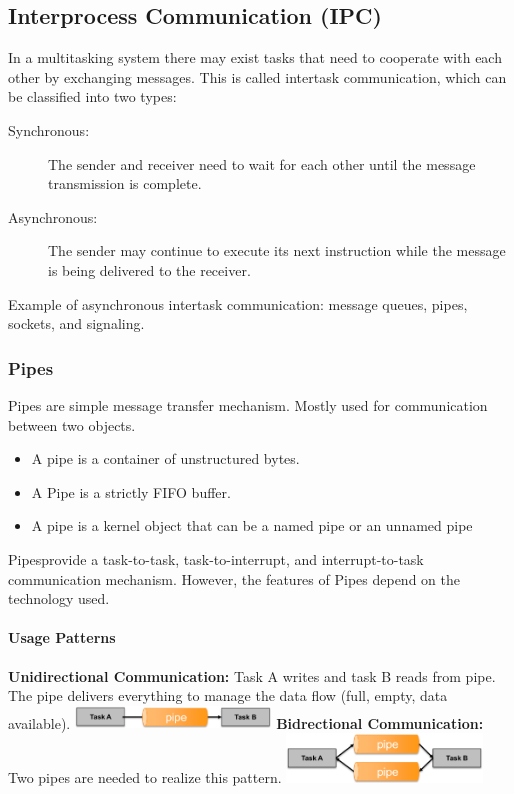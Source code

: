 \subsection{Interprocess Communication (IPC)}
In a multitasking system there may exist tasks that need to cooperate with each other by exchanging messages.
This is called intertask communication, which can be classified into two types:
\begin{description}
  \item[Synchronous:] The sender and receiver need to wait for each other until the message transmission is complete.
  \item[Asynchronous:] The sender may continue to execute its next instruction while the message is being delivered to the receiver.
\end{description}
Example of asynchronous intertask communication: message queues, pipes, sockets, and signaling.

\subsubsection{Pipes}
Pipes are simple message transfer mechanism.
Mostly used for communication between two objects.
\begin{itemize}
  \item A pipe is a container of unstructured bytes.
  \item A Pipe is a strictly FIFO buffer.
  \item A pipe is a kernel object that can be a named pipe or an unnamed pipe
\end{itemize}
\glqq{}Pipes\grqq provide a task-to-task, task-to-interrupt, and interrupt-to-task communication mechanism.
However, the features of Pipes depend on the technology used.

\paragraph{Usage Patterns}
\begin{paracol}{2}
  \textbf{Unidirectional Communication:} Task A writes and task B reads from pipe.
  The pipe delivers everything to manage the data flow (full, empty, data available).
  \switchcolumn
  \includegraphics[width=0.39\textwidth]{images/Concurrency/uni_pipe.png}
  \switchcolumn
  \textbf{Bidrectional Communication:} Two pipes are needed to realize this pattern.
  \switchcolumn
  \includegraphics[width=0.39\textwidth]{images/Concurrency/bi_pipe.png}
\end{paracol}

